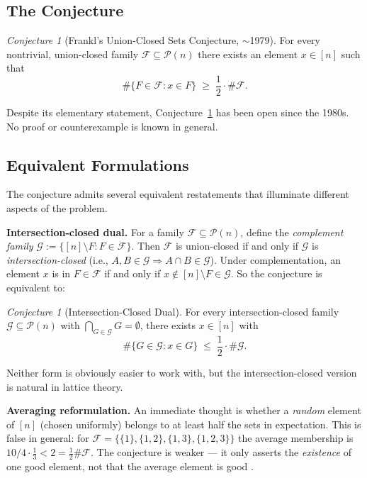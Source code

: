 \documentclass[11pt]{article}
\theoremstyle{definition}
\theoremstyle{remark}
\newtheorem{conjecture}[theorem]{Conjecture}
\newcommand{\F}{\mathcal{F}}
\newcommand{\G}{\mathcal{G}}
\newcommand{\Pow}{\mathcal{P}}
\begin{document}
\subsection{The Conjecture}

\begin{conjecture}[Frankl's Union-Closed Sets Conjecture, $\sim$1979]
\label{conj:func}
For every nontrivial, union-closed family $\F \subseteq \Pow(n)$
there exists an element $x \in [n]$ such that
\[
  \#\{F \in \F : x \in F\} \;\ge\; \frac{1}{2} \cdot \#\F.
\]
\end{conjecture}

Despite its elementary statement, Conjecture~\ref{conj:func} has been
open since the 1980s.  No proof or counterexample is known in general.

\subsection{Equivalent Formulations}

The conjecture admits several equivalent restatements that illuminate
different aspects of the problem.

\textbf{Intersection-closed dual.}
For a family $\F \subseteq \Pow(n)$, define the \emph{complement family}
$\G := \{[n] \setminus F : F \in \F\}$.
Then $\F$ is union-closed if and only if $\G$ is
\emph{intersection-closed} (i.e., $A, B \in \G \Rightarrow A \cap B \in \G$).
Under complementation, an element $x$ is in $F \in \F$ if and only if
$x \notin [n]\setminus F \in \G$.
So the conjecture is equivalent to:

\begin{conjecture}[Intersection-Closed Dual]
For every intersection-closed family $\G \subseteq \Pow(n)$ with
$\bigcap_{G\in\G} G = \emptyset$, there exists $x \in [n]$ with
\[
  \#\{G \in \G : x \in G\} \;\le\; \frac{1}{2}\cdot\#\G.
\]
\end{conjecture}

Neither form is obviously easier to work with, but the intersection-closed
version is natural in lattice theory.

\textbf{Averaging reformulation.}
An immediate thought is whether a \emph{random} element of $[n]$
(chosen uniformly) belongs to at least half the sets in expectation.
This is false in general: for $\F = \{\{1\},\{1,2\},\{1,3\},\{1,2,3\}\}$
the average membership is $10/4 \cdot \frac{1}{3} < 2 = \frac{1}{2}\#\F$.
The conjecture is weaker --- it only asserts the \emph{existence} of one
good element, not that the average element is good \cite{gowers2016}.
\end{document}
